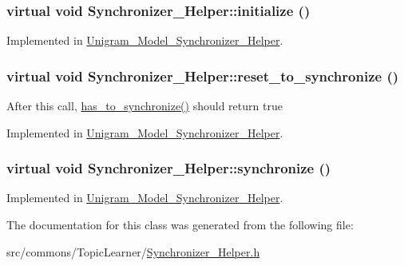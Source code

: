 \hypertarget{class_synchronizer___helper_a7732654b0b1f02ba661e520564a690b8}{
\subsubsection[{initialize}]{\setlength{\rightskip}{0pt plus 5cm}virtual void Synchronizer\_\-Helper::initialize ()}}
\label{class_synchronizer___helper_a7732654b0b1f02ba661e520564a690b8}


Implemented in \hyperlink{class_unigram___model___synchronizer___helper_aa1f5e5b097ff5f089dde9b34dd2fae3e}{Unigram\_\-Model\_\-Synchronizer\_\-Helper}.

\hypertarget{class_synchronizer___helper_ac58a4f287d5edd1fa6883701567da75a}{
\subsubsection[{reset\_\-to\_\-synchronize}]{\setlength{\rightskip}{0pt plus 5cm}virtual void Synchronizer\_\-Helper::reset\_\-to\_\-synchronize ()}}
\label{class_synchronizer___helper_ac58a4f287d5edd1fa6883701567da75a}
After this call, \hyperlink{class_synchronizer___helper_a1d9c38f95c9a3a517e5a89659aa4c522}{has\_\-to\_\-synchronize()} should return true 

Implemented in \hyperlink{class_unigram___model___synchronizer___helper_a3e9fef7c7c827ced4ec473e99c2c2ba0}{Unigram\_\-Model\_\-Synchronizer\_\-Helper}.

\hypertarget{class_synchronizer___helper_a18aca854fe152f99640556a2a4e04f96}{
\subsubsection[{synchronize}]{\setlength{\rightskip}{0pt plus 5cm}virtual void Synchronizer\_\-Helper::synchronize ()}}
\label{class_synchronizer___helper_a18aca854fe152f99640556a2a4e04f96}


Implemented in \hyperlink{class_unigram___model___synchronizer___helper_a270835ef882ab219a7f9ffe6000627e7}{Unigram\_\-Model\_\-Synchronizer\_\-Helper}.



The documentation for this class was generated from the following file:\begin{DoxyCompactItemize}
\item 
src/commons/TopicLearner/\hyperlink{_synchronizer___helper_8h}{Synchronizer\_\-Helper.h}\end{DoxyCompactItemize}
